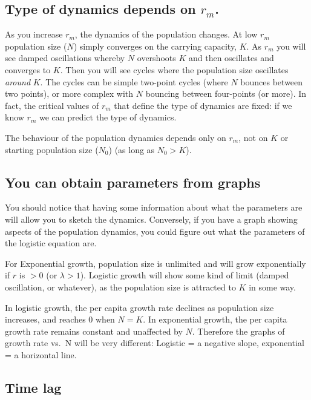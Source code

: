 \documentclass[
  a4paper]{book}
\begin{document}
\subsection{\texorpdfstring{Type of dynamics depends on \(r_m\).}{Type of dynamics depends on r\_m.}}\label{type-of-dynamics-depends-on-r_m.}

As you increase \(r_m\), the dynamics of the population changes. At low \(r_m\) population size (\(N\)) simply converges on the carrying capacity, \(K\). As \(r_m\) you will see damped oscillations whereby \(N\) overshoots \(K\) and then oscillates and converges to \(K\). Then you will see cycles where the population size oscillates \emph{around} \(K\). The cycles can be simple two-point cycles (where \(N\) bounces between two points), or more complex with \(N\) bouncing between four-points (or more). In fact, the critical values of \(r_m\) that define the type of dynamics are fixed: if we know \(r_m\) we can predict the type of dynamics.

The behaviour of the population dynamics depends only on \(r_m\), not on \(K\) or starting population size (\(N_0\)) (as long as \(N_0 > K\)).

\subsection{You can obtain parameters from graphs}\label{you-can-obtain-parameters-from-graphs}

You should notice that having some information about what the parameters are will allow you to sketch the dynamics. Conversely, if you have a graph showing aspects of the population dynamics, you could figure out what the parameters of the logistic equation are.

For Exponential growth, population size is unlimited and will grow exponentially if \(r\) is \(>0\) (or \(\lambda > 1\)). Logistic growth will show some kind of limit (damped oscillation, or whatever), as the population size is attracted to \(K\) in some way.

In logistic growth, the per capita growth rate declines as population size increases, and reaches \(0\) when \(N = K\). In exponential growth, the per capita growth rate remains constant and unaffected by \(N\). Therefore the graphs of growth rate vs.~N will be very different: Logistic = a negative slope, exponential = a horizontal line.

\subsection{Time lag}\label{time-lag}
\end{document}
